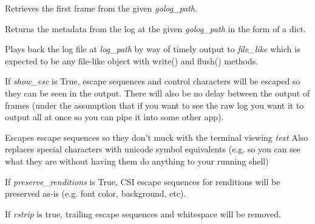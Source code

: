 \documentclass[letterpaper,10pt,openany]{sphinxmanual}
\begin{document}
\begin{fulllineitems}
\label{Developer/logviewer:logviewer.retrieve_first_frame}
Retrieves the first frame from the given \emph{golog\_path}.

\end{fulllineitems}


\begin{fulllineitems}
\label{Developer/logviewer:logviewer.get_log_metadata}
Returns the metadata from the log at the given \emph{golog\_path} in the form of
a dict.

\end{fulllineitems}


\begin{fulllineitems}
\label{Developer/logviewer:logviewer.playback_log}
Plays back the log file at \emph{log\_path} by way of timely output to \emph{file\_like}
which is expected to be any file-like object with write() and flush()
methods.

If \emph{show\_esc} is True, escape sequences and control characters will be
escaped so they can be seen in the output.  There will also be no delay
between the output of frames (under the assumption that if you want to see
the raw log you want it to output all at once so you can pipe it into
some other app).

\end{fulllineitems}


\begin{fulllineitems}
\label{Developer/logviewer:logviewer.escape_escape_seq}
Escapes escape sequences so they don't muck with the terminal viewing \emph{text}
Also replaces special characters with unicode symbol equivalents (e.g. so
you can see what they are without having them do anything to your running
shell)

If \emph{preserve\_renditions} is True, CSI escape sequences for renditions will
be preserved as-is (e.g. font color, background, etc).

If \emph{rstrip} is true, trailing escape sequences and whitespace will be
removed.

\end{fulllineitems}
\end{document}
